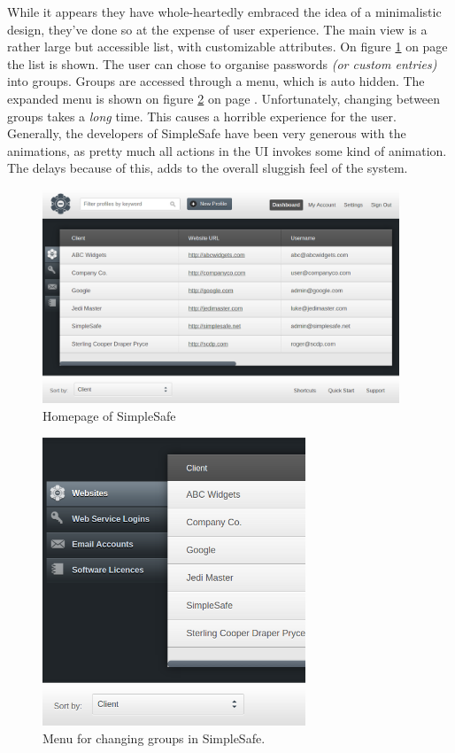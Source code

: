 			While it appears they have whole-heartedly embraced the idea of a minimalistic design, they've done so at the expense of user experience. The main view is a rather large but accessible list, with customizable attributes. On figure \ref{fig:simplesafe_main} on page \pageref{fig:simplesafe_main} the list is shown. The user can chose to organise passwords \emph{(or custom entries)} into groups. Groups are accessed through a menu, which is auto hidden. The expanded menu is shown on figure \ref{fig:simplesafe_menu} on page \pageref{fig:simplesafe_main}. Unfortunately, changing between groups takes a \emph{long} time. This causes a horrible experience for the user. Generally, the developers of SimpleSafe have been very generous with the animations, as pretty much all actions in the UI invokes some kind of animation. The delays because of this, adds to the overall sluggish feel of the system.

			\begin{figure}[htbp]
				\centering
				\includegraphics[width=0.95\textwidth]{figures/analysis/simplesafe_main.png}
				\caption{Homepage of SimpleSafe}
				\label{fig:simplesafe_main}
			\end{figure}

			\begin{figure}[htbp]
				\centering
				\includegraphics[width=0.70\textwidth]{figures/analysis/simplesafe_groups.png}
				\caption{Menu for changing groups in SimpleSafe.}
				\label{fig:simplesafe_menu}
			\end{figure}


